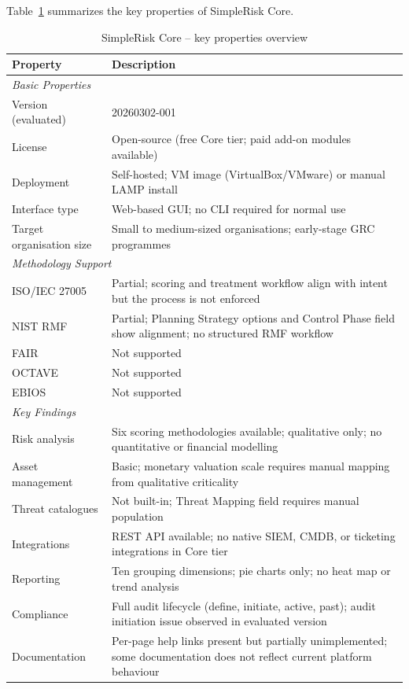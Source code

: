 Table~\ref{tab:simplerisk-overview} summarizes the key properties of SimpleRisk Core.
\begin{table}[H]
\centering
\renewcommand{\arraystretch}{1.3}
\begin{tabular}{|p{4.5cm}|p{9cm}|}
\hline
\textbf{Property} & \textbf{Description} \\
\hline
\multicolumn{2}{|l|}{\textit{Basic Properties}} \\
\hline
Version (evaluated) & 20260302-001 \\
\hline
License & Open-source (free Core tier; paid add-on modules available) \\
\hline
Deployment & Self-hosted; VM image (VirtualBox/VMware) or manual LAMP install \\
\hline
Interface type & Web-based GUI; no CLI required for normal use \\
\hline
Target organisation size & Small to medium-sized organisations; early-stage GRC programmes \\
\hline
\multicolumn{2}{|l|}{\textit{Methodology Support}} \\
\hline
ISO/IEC 27005 & Partial; scoring and treatment workflow align with intent but the process is not enforced \\
\hline
NIST RMF & Partial; Planning Strategy options and Control Phase field show alignment; no structured RMF workflow \\
\hline
FAIR & Not supported \\
\hline
OCTAVE & Not supported \\
\hline
EBIOS & Not supported \\
\hline
\multicolumn{2}{|l|}{\textit{Key Findings}} \\
\hline
Risk analysis & Six scoring methodologies available; qualitative only; no quantitative or financial modelling \\
\hline
Asset management & Basic; monetary valuation scale requires manual mapping from qualitative criticality \\
\hline
Threat catalogues & Not built-in; Threat Mapping field requires manual population \\
\hline
Integrations & REST API available; no native SIEM, CMDB, or ticketing integrations in Core tier \\
\hline
Reporting & Ten grouping dimensions; pie charts only; no heat map or trend analysis \\
\hline
Compliance & Full audit lifecycle (define, initiate, active, past); audit initiation issue observed in evaluated version \\
\hline
Documentation & Per-page help links present but partially unimplemented; some documentation does not reflect current platform behaviour \\
\hline
\end{tabular}
\caption{SimpleRisk Core -- key properties overview}
\label{tab:simplerisk-overview}
\end{table}

